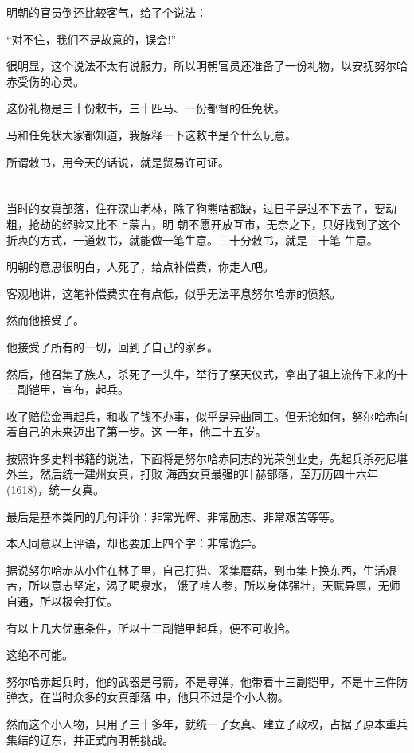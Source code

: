 \documentclass[11pt,a4paper,onecolumn]{article}
\begin{document}
明朝的官员倒还比较客气，给了个说法：

``对不住，我们不是故意的，误会!''

很明显，这个说法不太有说服力，所以明朝官员还准备了一份礼物，以安抚努尔哈赤受伤的心灵。

这份礼物是三十份敕书，三十匹马、一份都督的任免状。

马和任免状大家都知道，我解释一下这敕书是个什么玩意。

所谓敕书，用今天的话说，就是贸易许可证。

\section[\thesection]{}

当时的女真部落，住在深山老林，除了狗熊啥都缺，过日子是过不下去了，要动粗，抢劫的经验又比不上蒙古，明
朝不愿开放互市，无奈之下，只好找到了这个折衷的方式，一道敕书，就能做一笔生意。三十分敕书，就是三十笔
生意。

明朝的意思很明白，人死了，给点补偿费，你走人吧。

客观地讲，这笔补偿费实在有点低，似乎无法平息努尔哈赤的愤怒。

然而他接受了。

他接受了所有的一切，回到了自己的家乡。

然后，他召集了族人，杀死了一头牛，举行了祭天仪式，拿出了祖上流传下来的十三副铠甲，宣布，起兵。

收了赔偿金再起兵，和收了钱不办事，似乎是异曲同工。但无论如何，努尔哈赤向着自己的未来迈出了第一步。这
一年，他二十五岁。

按照许多史料书籍的说法，下面将是努尔哈赤同志的光荣创业史，先起兵杀死尼堪外兰，然后统一建州女真，打败
海西女真最强的叶赫部落，至万历四十六年(1618)，统一女真。

最后是基本类同的几句评价：非常光辉、非常励志、非常艰苦等等。

本人同意以上评语，却也要加上四个字：非常诡异。

据说努尔哈赤从小住在林子里，自己打猎、采集蘑菇，到市集上换东西，生活艰苦，所以意志坚定，渴了喝泉水，
饿了啃人参，所以身体强壮，天赋异禀，无师自通，所以极会打仗。

有以上几大优惠条件，所以十三副铠甲起兵，便不可收拾。

这绝不可能。

努尔哈赤起兵时，他的武器是弓箭，不是导弹，他带着十三副铠甲，不是十三件防弹衣，在当时众多的女真部落
中，他只不过是个小人物。

然而这个小人物，只用了三十多年，就统一了女真、建立了政权，占据了原本重兵集结的辽东，并正式向明朝挑战。
\end{document}

